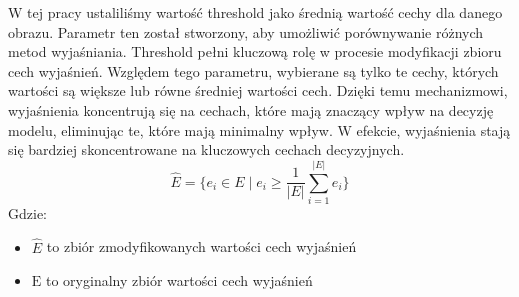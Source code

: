 W tej pracy ustaliliśmy wartość threshold jako średnią wartość cechy dla danego obrazu.
Parametr ten został stworzony, aby umożliwić porównywanie różnych metod wyjaśniania.
Threshold pełni kluczową rolę w procesie modyfikacji zbioru cech wyjaśnień.
Względem tego parametru, wybierane są tylko te cechy, których wartości są większe lub równe średniej wartości cech.
Dzięki temu mechanizmowi, wyjaśnienia koncentrują się na cechach, które mają znaczący wpływ na decyzję modelu, eliminując te, które mają minimalny wpływ.
W efekcie, wyjaśnienia stają się bardziej skoncentrowane na kluczowych cechach decyzyjnych.
\begin{equation}
	\hat{E} =  \{ e_i \in E \mid e_i \geq \frac{1}{|E|}\sum_{i=1}^{|E|} e_i \}
	\label{eq:modified_explanation}
\end{equation}
Gdzie:
\begin{itemize}[label=]
	\item $\hat{E}$ to zbiór zmodyfikowanych wartości cech wyjaśnień
	\item $\text{E}$ to oryginalny zbiór wartości cech wyjaśnień
\end{itemize}

